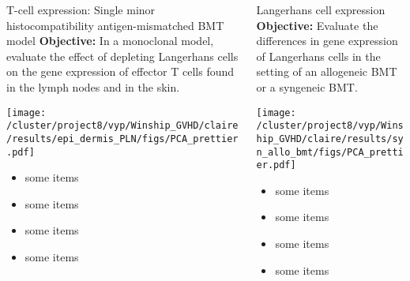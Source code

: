 \documentclass[final,hyperref={pdfpagelabels=false}]{beamer}
\begin{document}
\begin{frame}{}
\begin{columns}[t]
      \begin{column}{.25\linewidth}
        \begin{block}{T-cell expression: Single minor histocompatibility antigen-mismatched BMT model}
	  {\bf Objective:} In a monoclonal model, evaluate the effect of depleting Langerhans cells on the gene expression of effector T cells found in the lymph nodes and in the skin.
	  \begin{center}
	   \texttt{[image: /cluster/project8/vyp/Winship\_GVHD/claire/results/epi\_dermis\_PLN/figs/PCA\_prettier.pdf]}
            \end{center}
          \begin{itemize}
          \item some items
          \item some items
          \item some items
          \item some items
          \end{itemize}
        \end{block}
      \end{column}


      \begin{column}{.25\linewidth}
        \begin{block}{Langerhans cell expression}
	  {\bf Objective:} Evaluate the differences in gene expression of Langerhans cells in the setting of an allogeneic BMT or a syngeneic BMT.
           \begin{center}
           \texttt{[image: /cluster/project8/vyp/Winship\_GVHD/claire/results/syn\_allo\_bmt/figs/PCA\_prettier.pdf]}
          \end{center}

          \begin{itemize}
          \item some items
          \item some items
          \item some items
          \item some items
          \end{itemize}
        \end{block}
      \end{column}


    \end{columns}
  \end{frame}
\end{document}
